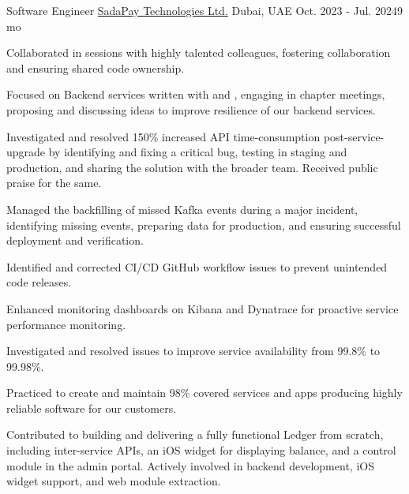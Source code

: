 

\begin{cventries}

  \cventry
  {Software Engineer} %
  {\href{https://sadapay.pk/}{SadaPay Technologies Ltd.}} %
  {Dubai, UAE} %
  {Oct. 2023 - Jul. 2024{\enskip\cdotp\enskip}9 mo} %
  {
    \begin{cvitems} %
      \item {Collaborated in  sessions with highly talented colleagues, fostering collaboration and ensuring shared code ownership.}
      \item {Focused on Backend services written with  and , engaging in chapter meetings, proposing and discussing ideas to improve resilience of our backend services.}
      \item {Investigated and resolved 150\% increased API time-consumption post-service-upgrade by identifying and fixing a critical bug, testing in staging and production, and sharing the solution with the broader team. Received public praise for the same.}
      \item {Managed the backfilling of missed Kafka events during a major incident, identifying missing events, preparing data for production, and ensuring successful deployment and verification.}
      \item {Identified and corrected CI/CD GitHub workflow issues to prevent unintended code releases.}
      \item {Enhanced monitoring dashboards on Kibana and Dynatrace for proactive service performance monitoring.}
      \item {Investigated and resolved issues to improve service availability from 99.8\% to 99.98\%.}
      \item {Practiced  to create and maintain 98\% covered services and apps producing highly reliable software for our customers.}
      \item {Contributed to building and delivering a fully functional Ledger from scratch, including inter-service APIs, an iOS widget for displaying balance, and a control module in the admin portal. Actively involved in backend development, iOS widget support, and web module extraction.}

\end{cvitems}}
\end{cventries}

